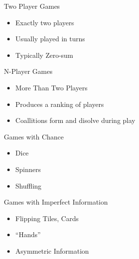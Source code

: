 \documentclass{powerdot}
\begin{document}
\begin{slide}{Two Player Games}
  \twocolumn{
  }
            {\begin{itemize}
                \item Exactly two players
                \item Usually played in turns
                \item Typically Zero-sum
              \end{itemize}
            }
\end{slide}

\begin{slide}{N-Player Games}
  \twocolumn{
  }
            {\begin{itemize}
                \item More Than Two Players
                \item Produces a ranking of players
                \item Coallitions form and disolve during play
              \end{itemize}
            }
\end{slide}

\begin{slide}{Games with Chance}
  \twocolumn{
  }
  {\begin{itemize}
      \item Dice
      \item Spinners
      \item Shuffling
    \end{itemize}
    }
\end{slide}

\begin{slide}{Games with Imperfect Information}
  \twocolumn{
  }
            {\begin{itemize}
                \item Flipping Tiles, Cards
                \item ``Hands''
                \item Asymmetric Information
            \end{itemize}}
\end{slide}
\end{document}
